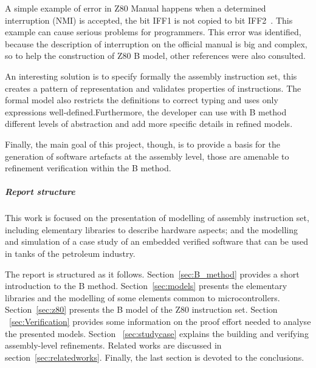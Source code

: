 \documentclass[11pt]{article} %
\begin{document}
A simple example of error in Z80 Manual happens
when a determined interruption (NMI) is accepted, the bit IFF1 is not
copied to bit IFF2~\cite{UndocumentedZ80}.  This example can cause serious
problems for programmers.
This error was identified, because the description of interruption on the
official manual is big and complex, so to help the construction of Z80 B model,
other references \cite{UndocumentedZ80,Simulator_z80}  were also consulted.

An interesting solution is to specify formally the assembly instruction set, this
creates a pattern of representation and validates properties of instructions. The
formal model also restricts the definitions to correct typing and uses only
expressions well-defined.Furthermore, the developer can use with B method
different levels of abstraction and add more specific details in refined models.
 
Finally, the main goal of this project, though, is to provide a basis for the
generation of software artefacts at the assembly level, those are amenable to 
refinement verification within the B method.

\subparagraph{Report structure}

This work is focused on the presentation of modelling of assembly instruction
set, including elementary libraries to describe hardware aspects; and the
modelling and simulation of a case study of an embedded verified software that
can be used in tanks of the petroleum industry.   

The report is structured as it follows. Section~\ref{sec:B_method} provides a
short introduction to the B method. Section~\ref{sec:models} presents the elementary libraries and
the modelling of some elements common to microcontrollers.  Section~\ref{sec:z80}
presents the B model of the Z80 instruction set. Section ~\ref{sec:Verification}
provides some information on the proof effort needed to analyse the presented
models. Section ~\ref{sec:studycase} explains the building and verifying
assembly-level refinements. Related works are discussed in
section~\ref{sec:relatedworks}. Finally, the last section is devoted to the conclusions.
\end{document}
